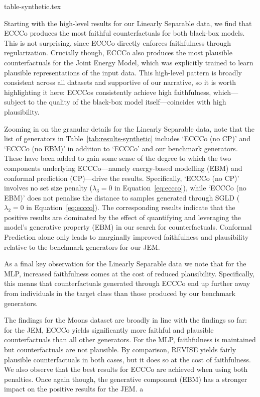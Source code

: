 \documentclass{article}
\begin{document}
{table-synthetic.tex}

Starting with the high-level results for our Linearly Separable data, we find that ECCCo produces the most faithful counterfactuals for both black-box models. This is not surprising, since ECCCo directly enforces faithfulness through regularization. Crucially though, ECCCo also produces the most plausible counterfactuals for the Joint Energy Model, which was explicitly trained to learn plausible representations of the input data. This high-level pattern is broadly consistent across all datasets and supportive of our narrative, so it is worth highlighting it here: ECCCos consistently achieve high faithfulness, which---subject to the quality of the black-box model itself---coincides with high plausibility. 

Zooming in on the granular details for the Linearly Separable data, note that the list of generators in Table~\ref{tab:results-synthetic} includes `ECCCo (no CP)' and `ECCCo (no EBM)' in addition to `ECCCo' and our benchmark generators. These have been added to gain some sense of the degree to which the two components underlying ECCCo---namely energy-based modelling (EBM) and conformal prediction (CP)---drive the results. Specifically, `ECCCo (no CP)' involves no set size penalty ($\lambda_3=0$ in Equation~\ref{eq:eccco}), while `ECCCo (no EBM)' does not penalise the distance to samples generated through SGLD ($\lambda_2=0$ in Equation~\ref{eq:eccco}). The corresponding results indicate that the positive results are dominated by the effect of quantifying and leveraging the model's generative property (EBM) in our search for counterfactuals. Conformal Prediction alone only leads to marginally improved faithfulness and plausibility relative to the benchmark generators for our JEM. 

As a final key observation for the Linearly Separable data we note that for the MLP, increased faithfulness comes at the cost of reduced plausibility. Specifically, this means that counterfactuals generated through ECCCo end up further away from individuals in the target class than those produced by our benchmark generators. 

The findings for the Moons dataset are broadly in line with the findings so far: for the JEM, ECCCo yields significantly more faithful and plausible counterfactuals than all other generators. For the MLP, faithfulness is maintained but counterfactuals are not plausible. By comparison, REVISE yields fairly plausible counterfactuals in both cases, but it does so at the cost of faithfulness. We also observe that the best results for ECCCo are achieved when using both penalties. Once again though, the generative component (EBM) has a stronger impact on the positive results for the JEM. a
\end{document}
